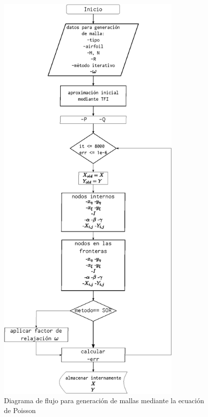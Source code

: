 \documentclass[letterpaper, openright, 12pt]{book}
\begin{document}
    \begin{figure}[htbp!]
        \centering
        \includegraphics[keepaspectratio, width=90mm]{./Imagenes/flujo_poisson}
        \caption{Diagrama de flujo para generación de mallas mediante la
            ecuación de Poisson}
        \label{flujo_poisson}
    \end{figure}
\end{document}
